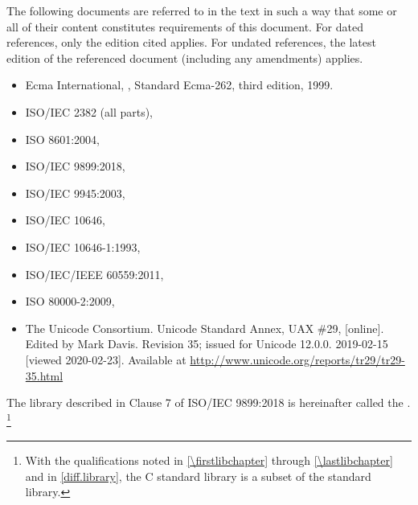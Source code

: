 \pnum
{}%
The following documents are referred to in the text
in such a way that some or all of their content
constitutes requirements
of this document. For dated references, only the edition cited applies.
For undated references, the latest edition of the referenced document
(including any amendments) applies.
\begin{itemize}
\item Ecma International, ,
Standard Ecma-262, third edition, 1999.
\item ISO/IEC 2382 (all parts), 
\item ISO 8601:2004, 
\item ISO/IEC 9899:2018, 
\item ISO/IEC 9945:2003, 
\item ISO/IEC 10646, 
\item ISO/IEC 10646-1:1993, 
\item ISO/IEC/IEEE 60559:2011, 
\item ISO 80000-2:2009, 
\item The Unicode Consortium. Unicode Standard Annex, UAX \#29,  [online].
Edited by Mark Davis. Revision 35; issued for Unicode 12.0.0. 2019-02-15 [viewed 2020-02-23].
Available at \url{http://www.unicode.org/reports/tr29/tr29-35.html}
\end{itemize}

\pnum
The library described in Clause 7 of ISO/IEC 9899:2018
is hereinafter called the
.%
\footnote{With the qualifications noted in \ref{\firstlibchapter}
through \ref{\lastlibchapter} and in \ref{diff.library}, the C standard
library is a subset of the \Cpp{} standard library.}

